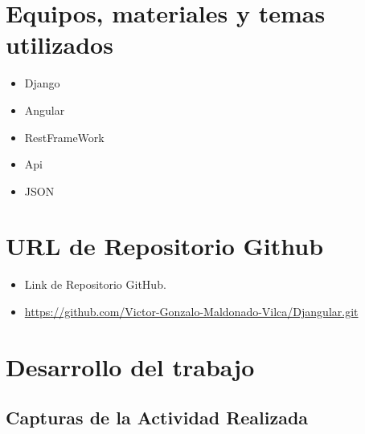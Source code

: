 \documentclass{article}
\begin{document}
		
	\section{Equipos, materiales y temas utilizados}
  \begin{itemize}
    \item Django
    \item Angular
    \item RestFrameWork
    \item Api
    \item JSON
  \end{itemize}
 

  \section{URL de Repositorio Github}
  \begin{itemize}
    \item Link de Repositorio GitHub.
    \item \url{https://github.com/Victor-Gonzalo-Maldonado-Vilca/Djangular.git}
  \end{itemize}


  \section{Desarrollo del trabajo}
  \subsection{Capturas de la Actividad Realizada}
\end{document}
